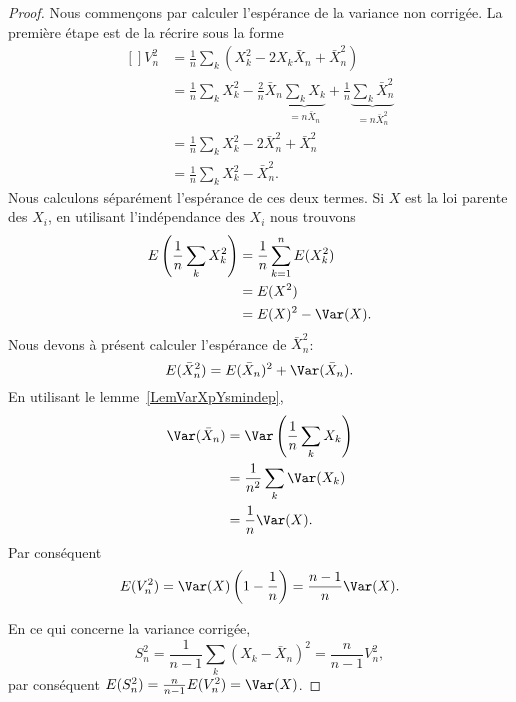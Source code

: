 \begin{proof}
    Nous commençons par calculer l'espérance de la variance non corrigée. La première étape est de la récrire sous la forme
    \begin{equation}
        \begin{aligned}[]
            V_n^2&=\frac{1}{ n }\sum_k(X_k^2-2X_k\bar X_n+\bar X_n^2)\\
            &=\frac{1}{ n }\sum_kX_k^2-\frac{ 2 }{ n }\bar X_n\underbrace{\sum_kX_k}_{=n\bar X_n}+\frac{1}{ n }\underbrace{\sum_k\bar X_n^2}_{=n\bar X_n^2}\\
            &=\frac{1}{ n }\sum_kX_k^2-2\bar X_n^2+\bar X_n^2\\
            &=\frac{1}{ n }\sum_kX_k^2-\bar X_n^2.
        \end{aligned}
    \end{equation}
    Nous calculons séparément l'espérance de ces deux termes. Si \( X\) est la loi parente des \( X_i\), en utilisant l'indépendance des \( X_i\) nous trouvons
    \begin{equation}
        \begin{aligned}[]
            E\left( \frac{1}{ n }\sum_kX_k^2 \right)&=\frac{1}{ n }\sum_{k=1}^nE(X_k^2)\\
            &=E(X^2)\\
            &=E(X)^2-\Var(X).
        \end{aligned}
    \end{equation}
    Nous devons à présent calculer l'espérance de \( \bar X_n^2\):
    \begin{equation}
        E(\bar X_n^2)=E(\bar X_n)^2+\Var(\bar X_n).
    \end{equation}
    En utilisant le lemme~\ref{LemVarXpYsmindep},
    \begin{subequations}
        \begin{align}
            \Var(\bar X_n)&=\Var\left( \frac{1}{ n }\sum_kX_k \right)\\
            &=\frac{1}{ n^2 }\sum_k\Var(X_k)\\
            &=\frac{1}{ n }\Var(X).
        \end{align}
    \end{subequations}
    Par conséquent
    \begin{equation}
        E(V_n^2)=\Var(X)\left( 1-\frac{1}{ n } \right)=\frac{ n-1 }{ n }\Var(X).
    \end{equation}

    En ce qui concerne la variance corrigée,
    \begin{equation}
        S_n^2=\frac{1}{ n-1 }\sum_k(X_k-\bar X_n)^2=\frac{ n }{ n-1 }V_n^2,
    \end{equation}
    par conséquent \( E(S_n^2)=\frac{ n }{ n-1 }E(V_n^2)=\Var(X)\).
\end{proof}

